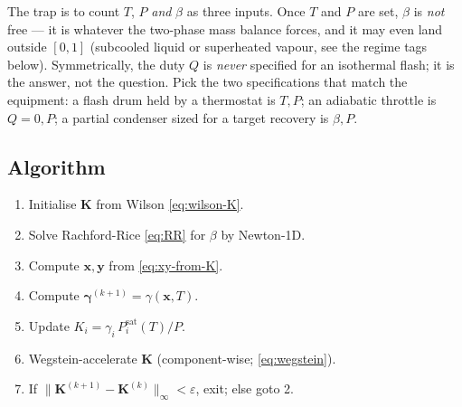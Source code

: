 \documentclass[11pt,a4paper]{article}
\newcommand{\Psat}{P^{\mathrm{sat}}}
\newcommand{\xv}{\mathbf{x}}
\newcommand{\yv}{\mathbf{y}}
\newcommand{\Kv}{\mathbf{K}}
\begin{document}
\begin{intuition}
The trap is to count $T$, $P$ \emph{and} $\beta$ as three inputs.  Once $T$ and
$P$ are set, $\beta$ is \emph{not} free --- it is whatever the two-phase mass
balance forces, and it may even land outside $[0,1]$ (subcooled liquid or
superheated vapour, see the regime tags below).  Symmetrically, the duty $Q$ is
\emph{never} specified for an isothermal flash; it is the answer, not the
question.  Pick the two specifications that match the equipment: a flash drum
held by a thermostat is $T,P$; an adiabatic throttle is $Q{=}0,P$; a partial
condenser sized for a target recovery is $\beta,P$.
\end{intuition}

\subsection{Algorithm}

\begin{enumerate}[leftmargin=*,nosep,topsep=2pt]
  \item Initialise $\Kv$ from Wilson \eqref{eq:wilson-K}.
  \item Solve Rachford-Rice \eqref{eq:RR} for $\beta$ by Newton-1D.
  \item Compute $\xv, \yv$ from \eqref{eq:xy-from-K}.
  \item Compute $\boldsymbol{\gamma}^{(k+1)} = \gamma(\xv, T)$.
  \item Update $K_i = \gamma_i \, \Psat_i(T) / P$.
  \item Wegstein-accelerate $\Kv$ (component-wise; \eqref{eq:wegstein}).
  \item If $\|\Kv^{(k+1)} - \Kv^{(k)}\|_\infty < \varepsilon$, exit; else goto 2.
\end{enumerate}
\end{document}
